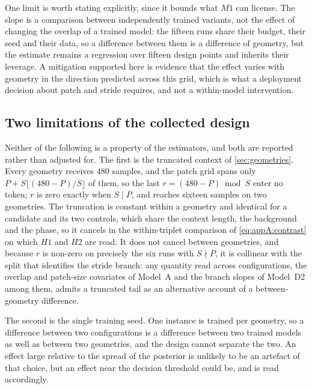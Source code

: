 One limit is worth stating explicitly, since it bounds what $M1$ can license. The slope is a comparison between independently trained variants, not the effect of changing the overlap of a trained model: the fifteen runs share their budget, their seed and their data, so a difference between them is a difference of geometry, but the estimate remains a regression over fifteen design points and inherits their leverage. A mitigation supported here is evidence that the effect varies with geometry in the direction predicted across this grid, which is what a deployment decision about patch and stride requires, and not a within-model intervention.

\subsection{Two limitations of the collected design}

Neither of the following is a property of the estimators, and both are reported rather than adjusted for. The first is the truncated context of \autoref{sec:geometries}. Every geometry receives $480$ samples, and the patch grid spans only $P+S\lfloor(480-P)/S\rfloor$ of them, so the last $r=(480-P)\bmod S$ enter no token; $r$ is zero exactly when $S \mid P$, and reaches sixteen samples on two geometries. The truncation is constant within a geometry and identical for a candidate and its two controls, which share the context length, the background and the phase, so it cancels in the within-triplet comparison of \autoref{eq:appA:contrast} on which $H1$ and $H2$ are read. It does not cancel between geometries, and because $r$ is non-zero on precisely the six runs with $S \nmid P$, it is collinear with the split that identifies the stride branch: any quantity read across configurations, the overlap and patch-size covariates of Model~A and the branch slopes of Model~D2 among them, admits a truncated tail as an alternative account of a between-geometry difference.

The second is the single training seed. One instance is trained per geometry, so a difference between two configurations is a difference between two trained models as well as between two geometries, and the design cannot separate the two. An effect large relative to the spread of the posterior is unlikely to be an artefact of that choice, but an effect near the decision threshold could be, and is read accordingly.

